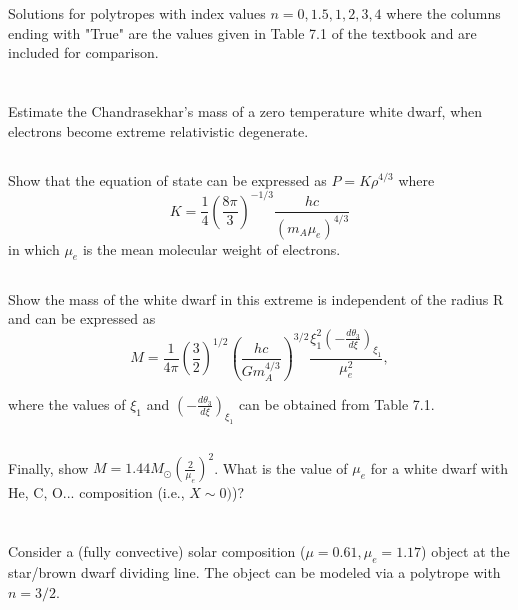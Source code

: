\begin{table}[]
    \centering
    
    \caption{Solutions for polytropes with index values $n=0,1.5,1,2,3,4$ where the columns ending with "True" are the values given in Table 7.1 of the textbook and are included for comparison.}
    \label{tab:LaneEmdenSolutions}
\end{table}



\section{}
Estimate the Chandrasekhar's mass of a zero temperature white dwarf, when electrons become extreme relativistic degenerate.
\subsection{}
Show that the equation of state can be expressed as $P=K\rho^{4/3}$ where
\begin{equation}
    K = \frac{1}{4}\left(\frac{8\pi}{3}\right)^{-1/3}\frac{hc}{(m_A\mu_e)^{4/3}}
\end{equation}
in which $\mu_e$ is the mean molecular weight of electrons.

\subsection{}
Show the mass of the white dwarf in this extreme is independent of the radius
R and can be expressed as
\begin{equation}
    M = \frac{1}{4\pi}\left(\frac{3}{2}\right)^{1/2}\left(\frac{hc}{Gm_A^{4/3}}\right)^{3/2}\frac{\xi_1^2\left(-\frac{d\theta_3}{d\xi}\right)_{\xi_1}}{\mu_e^2},
\end{equation}

where the values of $\xi_1$ and $\left(-\frac{d\theta_3}{d\xi}\right)_{\xi_1}$ can be obtained from Table 7.1.

\subsection{}
Finally, show $M=1.44M_\odot\left(\frac{2}{\mu_e}\right)^2$. What is the value of $\mu_e$ for a white dwarf with He, C, O... composition (i.e., $X\sim0)$)?



\section{}
Consider a (fully convective) solar composition ($\mu = 0.61, \mu_e = 1.17$) object at the
star/brown dwarf dividing line. The object can be modeled via a polytrope with
$n = 3/2$.

